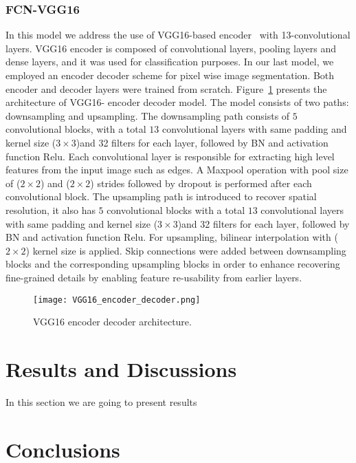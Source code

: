 \documentclass[preprint,9pt]{elsarticle}
\begin{document}
	\subsubsection{FCN-VGG16}
	In this model we address the use of VGG16-based encoder~\cite{Simonyan2015} with 13-convolutional layers.
	VGG16 encoder is composed of convolutional layers, pooling layers and dense layers, and it was used for classification purposes. 
	In our last model, we employed an encoder decoder scheme for pixel wise image segmentation. 
	Both encoder and decoder layers were trained from scratch.
	Figure~\ref{vgg16} presents the architecture of VGG16- encoder decoder model. 
	The model consists of two paths: downsampling and upsampling.
	The downsampling path consists of \(5\) convolutional blocks,  with a total \(13\) convolutional layers  with same padding and kernel size (\(3\times3\))and 32 filters for each layer, followed by BN and activation function Relu.
	Each convolutional layer is responsible for extracting high level features from the input image such as edges.
	A Maxpool operation with pool size of (\(2\times2\))  and (\(2\times2\)) strides followed by dropout is performed after each convolutional block. 
	The upsampling path is introduced to recover spatial resolution, it also has \(5\) convolutional blocks with a total \(13\) convolutional layers  with same padding and kernel size (\(3\times3\))and 32 filters for each layer, followed by BN and activation function Relu.
	For upsampling, bilinear interpolation with (\(2\times2\)) kernel size is applied.
	Skip connections were added between downsampling blocks and the corresponding upsampling blocks in order to enhance recovering fine-grained details by enabling feature re-usability from earlier layers.
	\begin{figure} [h!]
		\begin{center}
			\texttt{[image: VGG16\_encoder\_decoder.png]}
		\end{center}
		\caption{VGG16 encoder decoder architecture.} 
		\label{vgg16}
	\end{figure}

	\section{Results and Discussions}
	In this section we are going to present results

	\section{Conclusions}



	\section*{}

	
	\section*{ }
	{}
	
	
	
\end{document}
